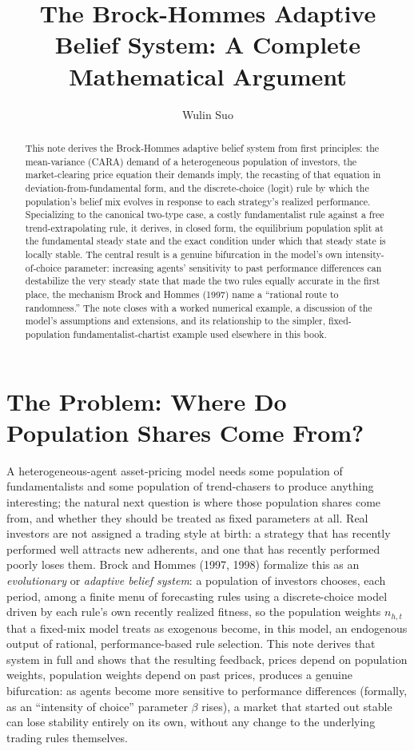\documentclass[11pt]{article}
\title{The Brock-Hommes Adaptive Belief System: A Complete Mathematical Argument}
\author{Wulin Suo}
\date{}
\theoremstyle{remark}
\theoremstyle{definition}
\begin{document}
\maketitle

\begin{abstract}
\noindent This note derives the Brock-Hommes adaptive belief system from first principles: the mean-variance (CARA) demand of a heterogeneous population of investors, the market-clearing price equation their demands imply, the recasting of that equation in deviation-from-fundamental form, and the discrete-choice (logit) rule by which the population's belief mix evolves in response to each strategy's realized performance. Specializing to the canonical two-type case, a costly fundamentalist rule against a free trend-extrapolating rule, it derives, in closed form, the equilibrium population split at the fundamental steady state and the exact condition under which that steady state is locally stable. The central result is a genuine bifurcation in the model's own intensity-of-choice parameter: increasing agents' sensitivity to past performance differences can destabilize the very steady state that made the two rules equally accurate in the first place, the mechanism Brock and Hommes (1997) name a ``rational route to randomness.'' The note closes with a worked numerical example, a discussion of the model's assumptions and extensions, and its relationship to the simpler, fixed-population fundamentalist-chartist example used elsewhere in this book.
\end{abstract}

\section{The Problem: Where Do Population Shares Come From?}
\label{sec:problem}

A heterogeneous-agent asset-pricing model needs some population of fundamentalists and some population of trend-chasers to produce anything interesting; the natural next question is where those population shares come from, and whether they should be treated as fixed parameters at all. Real investors are not assigned a trading style at birth: a strategy that has recently performed well attracts new adherents, and one that has recently performed poorly loses them. Brock and Hommes (1997, 1998) formalize this as an \emph{evolutionary} or \emph{adaptive belief system}: a population of investors chooses, each period, among a finite menu of forecasting rules using a discrete-choice model driven by each rule's own recently realized fitness, so the population weights $n_{h,t}$ that a fixed-mix model treats as exogenous become, in this model, an endogenous output of rational, performance-based rule selection. This note derives that system in full and shows that the resulting feedback, prices depend on population weights, population weights depend on past prices, produces a genuine bifurcation: as agents become more sensitive to performance differences (formally, as an ``intensity of choice'' parameter $\beta$ rises), a market that started out stable can lose stability entirely on its own, without any change to the underlying trading rules themselves.
\end{document}
